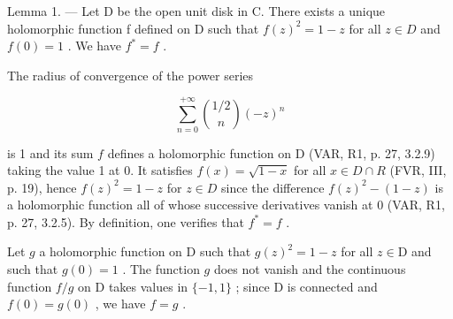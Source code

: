 Lemma 1. --- Let D be the open unit disk in C. There exists a unique holomorphic function f defined on D such that \(f(z)^{2} = 1 - z\) for all \(z \in D\) and \(f(0) = 1\) . We have \(f^{*} = f\) .

The radius of convergence of the power series

\[
\sum_ {n = 0} ^ {+ \infty} \binom {1 / 2} {n} (- z) ^ {n}
\]

is 1 and its sum \(f\) defines a holomorphic function on D (VAR, R1, p. 27, 3.2.9) taking the value 1 at 0. It satisfies \(f(x)=\sqrt{1-x}\) for all \(x \in D \cap R\) (FVR, III, p. 19), hence \(f(z)^{2} = 1 - z\) for \(z \in D\) since the difference \(f(z)^{2} - (1 - z)\) is a holomorphic function all of whose successive derivatives vanish at 0 (VAR, R1, p. 27, 3.2.5). By definition, one verifies that \(f^{*} = f\) .

Let \(g\) a holomorphic function on D such that \(g(z)^2 = 1 - z\) for all \(z \in \mathrm{D}\) and such that \(g(0) = 1\) . The function \(g\) does not vanish and the continuous function \(f / g\) on D takes values in \(\{-1, 1\}\) ; since D is connected and \(f(0) = g(0)\) , we have \(f = g\) .